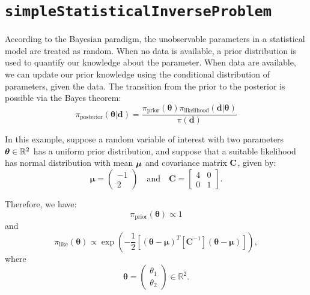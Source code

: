 \section{\texttt{simpleStatisticalInverseProblem}}\label{sec:example_sip}

According to the Bayesian paradigm, the unobservable parameters
in a statistical model are treated as random. When no data is available,
a prior distribution is used to quantify our knowledge about the parameter.
When data are available, we can update our prior knowledge using the conditional distribution of parameters, given the data. 
The transition from the prior to the posterior is possible via the Bayes theorem:
\begin{equation*}
\pi_{\text{posterior}}(\boldsymbol{\theta}|\mathbf{d})=\frac{\pi_{\text{prior}}(\boldsymbol{\theta})\pi_{\text{likelihood}}(\mathbf{d}|\boldsymbol{\theta})}{\pi(\mathbf{d})}
\end{equation*}


In this example, suppose a random variable of interest with two parameters $\mbox{\boldmath$ \theta $} \in \mathbb{R}^2$ has a uniform prior distribution, and suppose that a suitable likelihood has normal distribution with mean $\mbox{\boldmath$ \mu $}$ and covariance matrix $\bf{C}$, given by:
\begin{equation}\label{eq-example-mu}
\boldsymbol{\mu} = 
\left(\begin{array}{c}
-1 \\
2
\end{array}\right)
\quad
\text{and}
\quad
\mathbf{C} = 
\left[\begin{array}{cc}
4 & 0 \\
0 & 1
\end{array}\right].
\end{equation}

Therefore, we have: 
\begin{equation*}
\pi_{\text{prior}}(\boldsymbol{\theta}) \varpropto 1
\end{equation*}
and
\begin{equation*}
\pi_{\text{like}}(\boldsymbol{\theta}) \varpropto \exp \left(-\frac{1}{2}\left[(\boldsymbol{\theta}-\boldsymbol{\mu})^T[\mathbf{C}^{-1}](\boldsymbol{\theta}-\boldsymbol{\mu})\right] \right),
\end{equation*}
where
\begin{equation*}
\boldsymbol{\theta} = 
\left(
\begin{array}{c}
\theta_1 \\
\theta_2
\end{array}
\right)\in \mathbb{R}^2.
\end{equation*}
%


